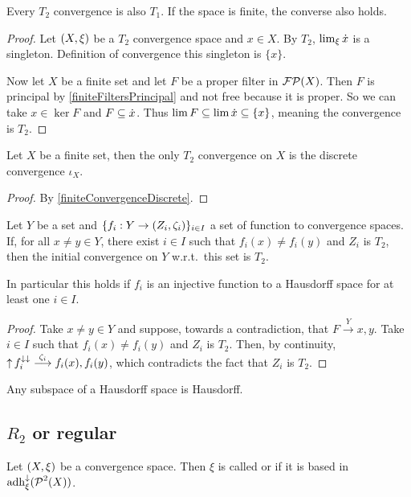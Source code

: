 \begin{proposition}
Every $T_2$ convergence is also $T_1$. If the space is finite, the converse also holds.
\end{proposition}
\begin{proof}
Let $\sSet{X, \xi}$ be a $T_2$ convergence space and $x\in X$. By $T_2$, $\lim_\xi\dot{x}$ is a singleton. Definition of convergence this singleton is $\{x\}$.

Now let $X$ be a finite set and let $F$ be a proper filter in $\operatorname{\mathcal{FP}}(X)$. Then $F$ is principal by \ref{finiteFiltersPrincipal} and not free because it is proper. So we can take $x\in \ker F$ and $F \subseteq \dot{x}$. Thus $\lim F \subseteq \lim \dot{x} \subseteq \{x\}$, meaning the convergence is $T_2$.
\end{proof}
\begin{corollary}
Let $X$ be a finite set, then the only $T_2$ convergence on $X$ is the discrete convergence $\iota_X$.
\end{corollary}
\begin{proof}
By \ref{finiteConvergenceDiscrete}.
\end{proof}

\begin{lemma} \label{T2initialConvergence}
Let $Y$ be a set and $\{f_i: Y\to \sSet{Z_i, \zeta_i}\}_{i\in I}$ a set of function to convergence spaces. If, for all $x \neq y\in Y$, there exist $i\in I$ such that $f_i(x) \neq f_i(y)$ and $Z_i$ is $T_2$, then the initial convergence on $Y$ w.r.t.\ this set is $T_2$.
\end{lemma}
In particular this holds if $f_i$ is an injective function to a Hausdorff space for at least one $i\in I$.
\begin{proof}
Take $x\neq y\in Y$ and suppose, towards a contradiction, that $F\overset{Y}{\longrightarrow} x,y$. Take $i\in I$ such that $f_i(x) \neq f_i(y)$ and $Z_i$ is $T_2$. Then, by continuity, $\operatorname{\uparrow} f_i^{\downarrow\downarrow} \overset{\zeta_i}{\longrightarrow} f_i(x), f_i(y)$, which contradicts the fact that $Z_i$ is $T_2$.
\end{proof}
\begin{corollary} \label{HausdorffSubspace}
Any subspace of a Hausdorff space is Hausdorff.
\end{corollary}


\subsection{$R_2$ or regular}
\begin{definition}
Let $\sSet{X,\xi}$ be a convergence space. Then $\xi$ is called  or  if it is based in $\operatorname{adh}_\xi^{\downarrow}(\operatorname{\mathcal{P}}^2(X))$.
\end{definition}

